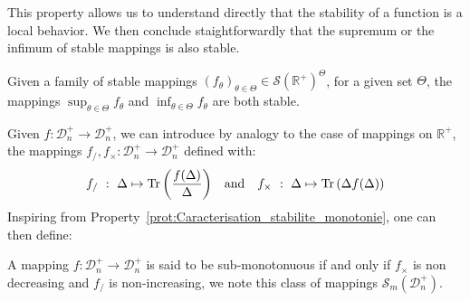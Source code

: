 \documentclass[a4papaer, titlepage]{book}
\begin{document}
This property allows us to understand directly that the stability of a function is a local behavior. We then conclude staightforwardly that the supremum or the infimum of stable mappings is also stable.
\begin{corollary}\label{cor:inf_sup_stable}
  Given a family of stable mappings $(f_\theta)_{\theta \in \Theta} \in \mathcal S(\mathbb R^+)^\Theta$, for a given set $\Theta$, the mappings $\sup_{\theta \in \Theta} f_\theta$ and $\inf_{\theta \in \Theta} f_\theta$ are both stable.
\end{corollary}

Given $f: \mathcal D^+_n \rightarrow \mathcal D^+_n$, we can introduce by analogy to the case of mappings on $\mathbb R^+$, the mappings $f_/, f_\times: \mathcal D^+_n \rightarrow \mathcal D^+_n$ defined with:
\begin{align*}
    f_{/} \ : \ \Delta \mapsto \operatorname{Tr}  \left(\frac{f(\Delta)}{\Delta}\right) &
    &\text{and}&
    &f_{\times} \ : \ \Delta \mapsto \operatorname{Tr}  \left(\Delta f(\Delta)\right)
\end{align*}
Inspiring from Property~\ref{prot:Caracterisation_stabilite_monotonie}, one can then define:
\begin{definition}\label{def:sub_monotonuous_class}
   A mapping $f: \mathcal D_n^+ \to \mathcal D_n^+$ is said to be sub-monotonuous if and only if $f_\times$ is non decreasing and $f_/$ is non-increasing, we note this class of mappings $ \mathcal S_m(\mathcal D_n^+)$.
 \end{definition} 
\end{document}
